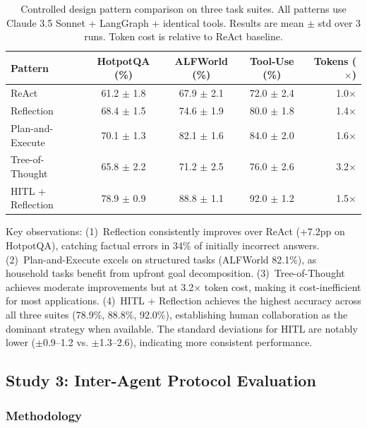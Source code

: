 \documentclass[review]{elsarticle}
\theoremstyle{definition}
\begin{document}
\begin{table}[ht]
\centering
\caption{Controlled design pattern comparison on three task suites. All patterns use Claude 3.5 Sonnet + LangGraph + identical tools. Results are mean $\pm$ std over 3 runs. Token cost is relative to ReAct baseline.}
\label{tab:patterns}
\begin{tabular}{lcccr}
\toprule
\textbf{Pattern} & \textbf{HotpotQA (\%)} & \textbf{ALFWorld (\%)} & \textbf{Tool-Use (\%)} & \textbf{Tokens ($\times$)} \\
\midrule
ReAct              & 61.2 $\pm$ 1.8  & 67.9 $\pm$ 2.1  & 72.0 $\pm$ 2.4 & 1.0$\times$ \\
Reflection         & 68.4 $\pm$ 1.5  & 74.6 $\pm$ 1.9  & 80.0 $\pm$ 1.8 & 1.4$\times$ \\
Plan-and-Execute   & 70.1 $\pm$ 1.3  & 82.1 $\pm$ 1.6  & 84.0 $\pm$ 2.0 & 1.6$\times$ \\
Tree-of-Thought    & 65.8 $\pm$ 2.2  & 71.2 $\pm$ 2.5  & 76.0 $\pm$ 2.6 & 3.2$\times$ \\
HITL + Reflection  & 78.9 $\pm$ 0.9  & 88.8 $\pm$ 1.1  & 92.0 $\pm$ 1.2 & 1.5$\times$ \\
\bottomrule
\end{tabular}
\end{table}

Key observations: (1)~Reflection consistently improves over ReAct (+7.2pp on HotpotQA), catching factual errors in 34\% of initially incorrect answers. (2)~Plan-and-Execute excels on structured tasks (ALFWorld 82.1\%), as household tasks benefit from upfront goal decomposition. (3)~Tree-of-Thought achieves moderate improvements but at 3.2$\times$ token cost, making it cost-inefficient for most applications. (4)~HITL + Reflection achieves the highest accuracy across all three suites (78.9\%, 88.8\%, 92.0\%), establishing human collaboration as the dominant strategy when available. The standard deviations for HITL are notably lower ($\pm$0.9--1.2 vs. $\pm$1.3--2.6), indicating more consistent performance.

\subsection{Study 3: Inter-Agent Protocol Evaluation}\label{sec:protocol-eval}

\subsubsection{Methodology}
\end{document}
